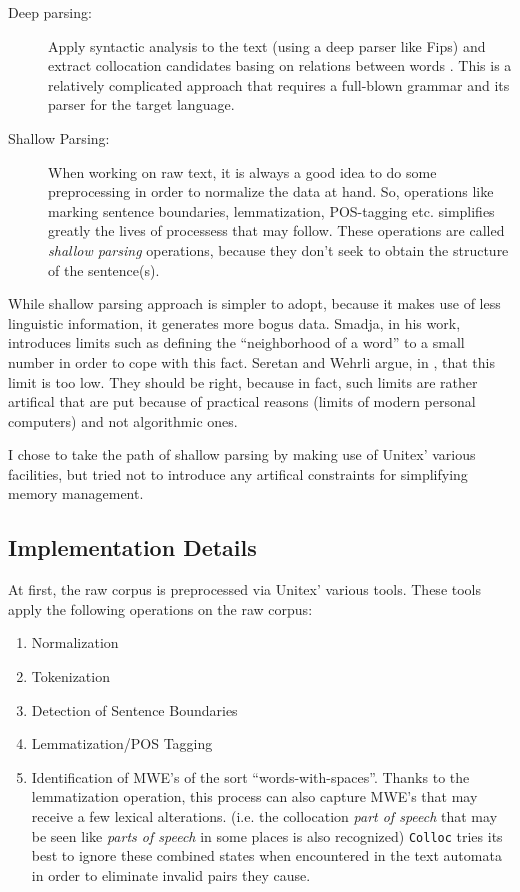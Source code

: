 \documentclass[a4paper,12pt,oneside]{article}
\begin{document}
\begin{description}
\item[Deep parsing:] Apply syntactic analysis to the text (using a deep parser like Fips\cite{fips2007}) and extract collocation candidates basing on relations between words \cite{SeretanWehrli2006ACL}. This is a relatively complicated approach that requires a full-blown grammar and its parser for the target language.

\item[Shallow Parsing:] When working on raw text, it is always a good idea to do some preprocessing in order to normalize the data at hand. So, operations like marking sentence boundaries, lemmatization, POS-tagging etc. simplifies greatly the lives of processess that may follow\cite{smadja93}. These operations are called \emph{shallow parsing} operations, because they don't seek to obtain the structure of the sentence(s).

\end{description}

While shallow parsing approach is simpler to adopt, because it makes use of less linguistic information, it generates more bogus data. Smadja, in his work\cite{smadja93}, introduces limits such as defining the ``neighborhood of a word'' to a small number in order to cope with this fact. Seretan and Wehrli argue, in \cite{SeretanWehrli2006ACL}, that this limit is too low. They should be right, because in fact, such limits are rather artifical that are put because of practical reasons (limits of modern personal computers) and not algorithmic ones.

I chose to take the path of shallow parsing by making use of Unitex' various facilities, but tried not to introduce any artifical constraints for simplifying memory management.

\subsection{Implementation Details}
At first, the raw corpus is preprocessed via Unitex' various tools. These tools apply the following operations on the raw corpus:
\begin{enumerate}
\item Normalization
\item Tokenization
\item Detection of Sentence Boundaries
\item Lemmatization/POS Tagging
\item Identification of MWE's of the sort ``words-with-spaces''. Thanks to the lemmatization operation, this process can also capture MWE's that may receive a few lexical alterations. (i.e. the collocation \emph{part of speech} that may be seen like \emph{parts of speech} in some places is also recognized) \texttt{Colloc} tries its best to ignore these combined states when encountered in the text automata in order to eliminate invalid pairs they cause.
\end{enumerate}
\end{document}
